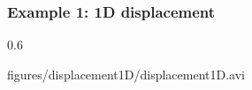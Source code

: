 \documentclass[screen, aspectratio=43]{beamer}
\begin{document}
\begin{frame}
  \frametitle{Example 1: 1D displacement}
  \centering
  \begin{mybox}{}{0.6\textheight}
    \begin{center}
    {figures/displacement1D/displacement1D.avi}
    \end{center}
  \end{mybox}
\end{frame}
\end{document}
